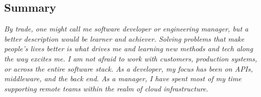 \documentclass[margin,line]{resume}
\begin{document}
\address{https://me.compile.fail $\bullet$ (618) 530-0659 $\bullet$ jesse@compile.fail}
\begin{resume}

\section{Summary}

{\small\textit{By trade, one might call me software developer or engineering manager, but a better description
would be learner and achiever. Solving problems that make people's lives better is what drives me and learning
new methods and tech along the way excites me. I am not afraid to work with customers, production systems,
or across the entire software stack. As a developer, my focus has been on APIs, middleware, and the back
end. As a manager, I have spent most of my time supporting remote teams within the realm of cloud infrastructure.}}



\end{resume}
\end{document}
